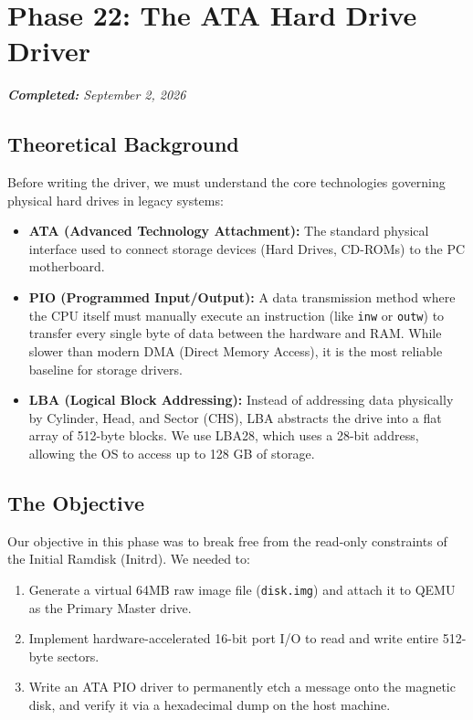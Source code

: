 \documentclass[12pt,a4paper]{report}
\begin{document}
\newpage


\section{Phase 22: The ATA Hard Drive Driver}
{\small\textit{\textbf{Completed:} September 2, 2026}}\par\medskip

\subsection{Theoretical Background}
Before writing the driver, we must understand the core technologies governing physical hard drives in legacy systems:
\begin{itemize}
    \item \textbf{ATA (Advanced Technology Attachment):} The standard physical interface used to connect storage devices (Hard Drives, CD-ROMs) to the PC motherboard.
    \item \textbf{PIO (Programmed Input/Output):} A data transmission method where the CPU itself must manually execute an instruction (like \texttt{inw} or \texttt{outw}) to transfer every single byte of data between the hardware and RAM. While slower than modern DMA (Direct Memory Access), it is the most reliable baseline for storage drivers.
    \item \textbf{LBA (Logical Block Addressing):} Instead of addressing data physically by Cylinder, Head, and Sector (CHS), LBA abstracts the drive into a flat array of 512-byte blocks. We use LBA28, which uses a 28-bit address, allowing the OS to access up to 128 GB of storage.
\end{itemize}

\subsection{The Objective}
Our objective in this phase was to break free from the read-only constraints of the Initial Ramdisk (Initrd). We needed to:
\begin{enumerate}
    \item Generate a virtual 64MB raw image file (\texttt{disk.img}) and attach it to QEMU as the Primary Master drive.
    \item Implement hardware-accelerated 16-bit port I/O to read and write entire 512-byte sectors.
    \item Write an ATA PIO driver to permanently etch a message onto the magnetic disk, and verify it via a hexadecimal dump on the host machine.
\end{enumerate}
\end{document}
